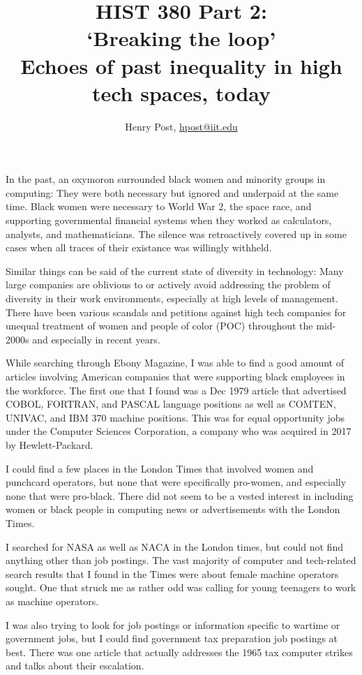 \documentclass[a4paper,12pt]{article}
\title{HIST 380 Part 2: \\ `Breaking the loop' \\ Echoes of past inequality in high tech spaces, today }
\author{Henry Post, \url{hpost@iit.edu}}
\begin{document}
\maketitle

\newpage
\doublespacing

In the past, an oxymoron surrounded black women and minority groups in computing: They were both necessary but ignored and underpaid at the same time. Black women were necessary to World War 2, the space race, and supporting governmental financial systems when they worked as calculators, analysts, and mathematicians. The silence was retroactively covered up in some cases when all traces of their existance was willingly withheld.

Similar things can be said of the current state of diversity in technology: Many large companies are oblivious to or actively avoid addressing the problem of diversity in their work environments, especially at high levels of management. There have been various scandals and petitions against high tech companies for unequal treatment of women and people of color (POC) throughout the mid-2000s and especially in recent years.

While searching through Ebony Magazine, I was able to find a good amount of articles involving American companies that were supporting black employees in the workforce. The first one that I found was a Dec 1979 article\cite{csc} that advertised COBOL, FORTRAN, and PASCAL language positions as well as COMTEN, UNIVAC, and IBM 370 machine positions. This was for equal opportunity jobs under the Computer Sciences Corporation, a company who was acquired in 2017 by Hewlett-Packard.

I could find a few places in the London Times that involved women and punchcard operators, but none that were specifically pro-women, and especially none that were pro-black. There did not seem to be a vested interest in including women or black people in computing news or advertisements with the London Times.

I searched for NASA as well as NACA in the London times, but could not find anything other than job postings. The vast majority of computer and tech-related search results that I found in the Times were about female machine operators sought. One that struck me as rather odd was calling for young teenagers to work as machine operators\cite{youngmachineop}.

I was also trying to look for job postings or information specific to wartime or government jobs, but I could find government tax preparation job postings at best. There was one article that actually addresses the 1965 tax computer strikes \cite{taxstrikes} and talks about their escalation.
\end{document}
